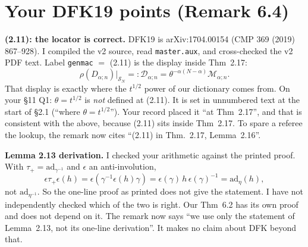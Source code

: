 \documentclass[11pt]{article}
\begin{document}
\section*{Your DFK19 points (Remark 6.4)}
\textbf{(2.11): the locator is correct.} DFK19 is arXiv:1704.00154 (CMP 369 (2019) 867--928). I compiled the v2 source, read \texttt{master.aux}, and cross-checked the v2 PDF text. Label \texttt{genmac} $=$ (2.11) is the display inside Thm~2.17:
\[\rho(D_{\alpha;n})|_{\mathcal S_N}=:\mathcal D_{\alpha;n}=\theta^{-\alpha(N-\alpha)}\mathcal M_{\alpha;n}.\]
That display is exactly where the $t^{1/2}$ power of our dictionary comes from. On your \S11 Q1: $\theta=t^{1/2}$ is \emph{not} defined at (2.11). It is set in unnumbered text at the start of \S2.1 (``where $\theta=t^{1/2}$''). Your record placed it ``at Thm~2.17'', and that is consistent with the above, because (2.11) sits inside Thm~2.17. To spare a referee the lookup, the remark now cites ``(2.11) in Thm.~2.17, Lemma~2.16''.

\textbf{Lemma 2.13 derivation.} I checked your arithmetic against the printed proof. With $\tau_+=\mathrm{ad}_{\gamma^{-1}}$ and $\epsilon$ an anti-involution,
\[\epsilon\tau_+\epsilon(h)=\epsilon(\gamma^{-1}\epsilon(h)\gamma)=\epsilon(\gamma)\,h\,\epsilon(\gamma)^{-1}=\mathrm{ad}_\eta(h),\]
not $\mathrm{ad}_{\eta^{-1}}$. So the one-line proof as printed does not give the statement. I have not independently checked which of the two is right. Our Thm~6.2 has its own proof and does not depend on it. The remark now says ``we use only the statement of Lemma~2.13, not its one-line derivation''. It makes no claim about DFK beyond that.
\end{document}

